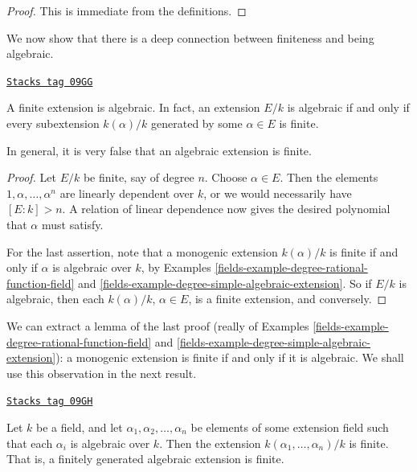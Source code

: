 \begin{proof}
This is immediate from the definitions.
\end{proof}

We now show that there is a deep connection between finiteness and being
algebraic.

\begin{lemma}
\label{fields-lemma-finite-is-algebraic}
\href{https://stacks.math.columbia.edu/tag/09GG}{\texttt{Stacks tag 09GG}}

A finite extension is algebraic. In fact, an extension $E/k$ is algebraic
if and only if every subextension $k(\alpha)/k$ generated by some
$\alpha \in E$ is finite.
\end{lemma}

In general, it is very false that an algebraic extension is finite.

\begin{proof}

Let $E/k$ be finite, say of degree $n$. Choose $\alpha \in E$. Then the
elements $1, \alpha, \ldots, \alpha^n$ are linearly
dependent over $k$, or we would necessarily have $[E : k] > n$. A relation of
linear dependence now gives the desired polynomial that $\alpha$ must satisfy.

\medskip\noindent
For the last assertion, note that a monogenic extension $k(\alpha)/k$ is
finite if and only if $\alpha$ is algebraic over $k$, by
Examples \ref{fields-example-degree-rational-function-field} and
\ref{fields-example-degree-simple-algebraic-extension}.
So if $E/k$ is algebraic, then each $k(\alpha)/k$, $\alpha \in E$, is a finite
extension, and conversely.
\end{proof}

We can extract a lemma of the last proof (really of
Examples \ref{fields-example-degree-rational-function-field} and
\ref{fields-example-degree-simple-algebraic-extension}):
a monogenic extension is finite if and only if it is algebraic.
We shall use this observation in the next result.

\begin{lemma}
\label{fields-lemma-algebraic-finitely-generated}
\href{https://stacks.math.columbia.edu/tag/09GH}{\texttt{Stacks tag 09GH}}


Let $k$ be a field, and let $\alpha_1, \alpha_2, \ldots, \alpha_n$ be elements
of some extension field such that each $\alpha_i$ is algebraic over $k$. Then
the extension $k(\alpha_1, \ldots, \alpha_n)/k$ is finite.
That is, a finitely generated algebraic extension is finite.
\end{lemma}

